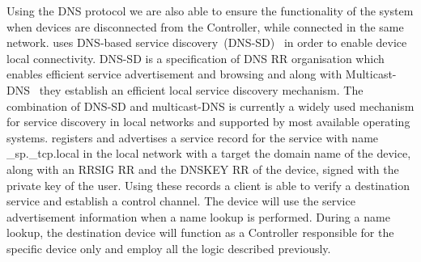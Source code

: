 Using the DNS protocol we are also able to ensure the functionality of the
system when devices are disconnected from the \signpost Controller, while
connected in the same network. \signpost uses DNS-based service
discovery~(DNS-SD)~\cite{RFC6763} in order to enable device local connectivity.
DNS-SD is a specification of DNS RR organisation which enables efficient service
advertisement and browsing and along with Multicast-DNS~\cite{RFC6762} they
establish an efficient local service discovery mechanism. The combination of
DNS-SD and multicast-DNS is currently a widely used mechanism for service
discovery in local networks and supported by most available operating systems.
\signpost registers and advertises a service record for the \signpost service
with name \_sp.\_tcp.local in the local network with a target the domain name of
the device, along with an RRSIG RR and the DNSKEY RR of the device, signed with
the private key of the user. Using these records a \signpost client is able to
verify a destination \signpost service and establish a control channel. 
The device will use the service advertisement information when a name lookup is
performed. During a name lookup,  the destination device will function as a
\signpost Controller responsible for the specific device only and employ all the
logic described previously.

